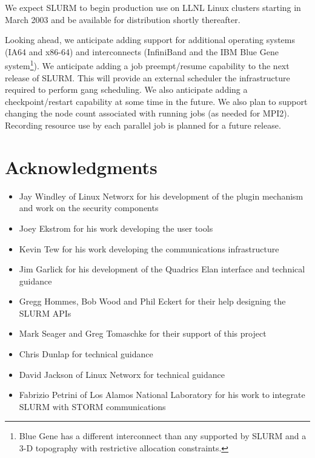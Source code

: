 \documentclass[10pt,onecolumn,times]{../common/llncs}
\begin{document}
{We expect SLURM to begin production use on LLNL Linux clusters 
starting in March 2003 and be available for distribution shortly 
thereafter. 

Looking ahead, we anticipate adding support for additional operating
systems (IA64 and x86-64) and interconnects (InfiniBand and the IBM
Blue Gene\cite{BlueGene2002} system\footnote{Blue Gene has a different
interconnect than any supported by SLURM and a 3-D topography with
restrictive allocation constraints.}).  We anticipate adding a job
preempt/resume capability to the next release of SLURM.  This will
provide an external scheduler the infrastructure required to perform gang
scheduling.  We also anticipate adding a checkpoint/restart capability at
some time in the future.  We also plan to support changing the node count
associated with running jobs (as needed for MPI2).  Recording resource
use by each parallel job is planned for a future release.

\section{Acknowledgments}

\begin{itemize}
\item Jay Windley of Linux Networx for his development of the plugin 
mechanism and work on the security components
\item Joey Ekstrom for his work developing the user tools
\item Kevin Tew for his work developing the communications infrastructure
\item Jim Garlick for his development of the Quadrics Elan interface and 
technical guidance
\item Gregg Hommes, Bob Wood and Phil Eckert for their help designing the 
SLURM APIs
\item Mark Seager and Greg Tomaschke for their support of this project
\item Chris Dunlap for technical guidance
\item David Jackson of Linux Networx for technical guidance
\item Fabrizio Petrini of Los Alamos National Laboratory for his work to 
integrate SLURM with STORM communications 
\end{itemize}

}
\end{document}

